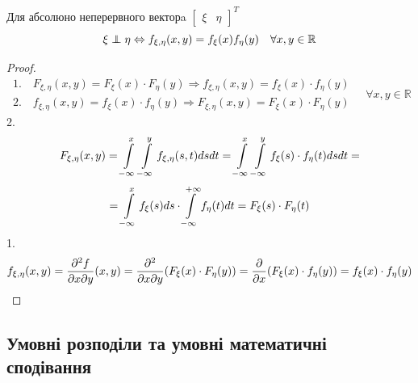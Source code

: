 \begin{boxteo}Для абсолюно неперервного векторa $\begin{bmatrix}
	 \xi& \eta
	\end{bmatrix}^T$\\
$$\xi \independent \eta \Leftrightarrow f_{\xi, \eta} (x,y)= f_{\xi}(x) f_{\eta}(y) \quad \forall x,y \in \mathbb{R}$$
\end{boxteo}

\begin{proof}
$$
\begin{gathered}
1. \quad  F_{\xi, \eta} (x,y) = F_{\xi}(x) \cdot F_{\eta}(y) \Longrightarrow f_{\xi, \eta} (x,y) = f_{\xi}(x) \cdot f_{\eta}(y)\\
	2. \quad f_{\xi, \eta} (x,y) = f_{\xi}(x) \cdot f_{\eta}(y)\Longrightarrow F_{\xi, \eta} (x,y) = F_{\xi}(x) \cdot F_{\eta}(y)
\end{gathered}\quad \forall x,y \in \mathbb{R}
$$
2.
$$
F_{\xi, \eta} (x,y ) =  \int\limits_{-\infty}^{ x}{  \int\limits_{- \infty}^{y}{ f_{\xi, \eta} (s,t) dsdt}} =  \int\limits_{- \infty}^{ x}{  \int\limits_{-\infty}^{y}{ f_{\xi} (s) \cdot f_{\eta} (t)dsdt}} =
$$
$$
= \int\limits_{-\infty}^{ x}{ f_ \xi (s) ds}\cdot  \int\limits_{-\infty}^{ +\infty}{f_\eta(t) dt} = F_{\xi}(s)\cdot F_{\eta}(t)
$$
1.
$$
f_{\xi, \eta} (x,y) = \frac{\partial^2 f}{\partial x \partial y} (x,y) = \frac{\partial ^2}{\partial x \partial y} (F_{\xi}(x) \cdot F_{ \eta} (y) ) = \frac{\partial}{\partial x} (F_{\xi} (x) \cdot f_{\eta} (y) ) = f_{\xi}(x) \cdot f_{\eta}(y)
$$
\end{proof}

\subsection{Умовні розподіли та умовні математичні сподівання}

